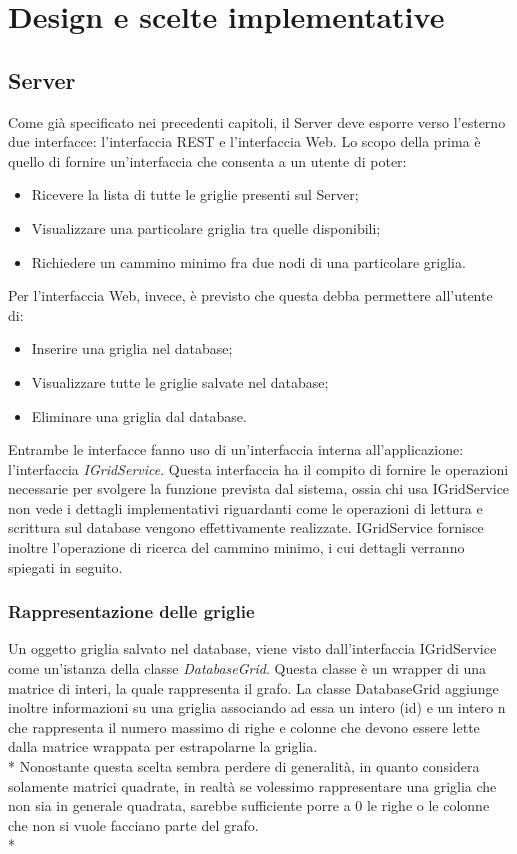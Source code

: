 \chapter{Design e scelte implementative}

\section{Server}

Come gi\`a specificato nei precedenti capitoli, il Server deve esporre verso l'esterno due interfacce: l'interfaccia REST e l'interfaccia Web. Lo scopo della prima \`e quello di fornire un'interfaccia che consenta a un utente di poter:
\begin{itemize}
	\item Ricevere la lista di tutte le griglie presenti sul Server;
	\item Visualizzare una particolare griglia tra quelle disponibili;
	\item Richiedere un cammino minimo fra due nodi di una particolare griglia.
\end{itemize}
Per l'interfaccia Web, invece, \`e previsto che questa debba permettere all'utente di:
\begin{itemize}
	\item Inserire una griglia nel database;
	\item Visualizzare tutte le griglie salvate nel database;
	\item Eliminare una griglia dal database.
\end{itemize}
Entrambe le interfacce fanno uso di un'interfaccia interna all'applicazione: l'interfaccia \emph{IGridService}. Questa interfaccia ha il compito di fornire le operazioni necessarie per svolgere la funzione prevista dal sistema, ossia chi usa IGridService non vede i dettagli implementativi riguardanti come le operazioni di lettura e scrittura sul database vengono effettivamente realizzate. IGridService fornisce inoltre l'operazione di ricerca del cammino minimo, i cui dettagli verranno spiegati in seguito.
\subsection{Rappresentazione delle griglie}
Un oggetto griglia salvato nel database, viene visto dall'interfaccia IGridService come un'istanza della classe \emph{DatabaseGrid}. Questa classe \`e un wrapper di una matrice di interi, la quale rappresenta il grafo. La classe DatabaseGrid aggiunge inoltre informazioni su una griglia associando ad essa un intero (id) e un intero n che rappresenta il numero massimo di righe e colonne che devono essere lette dalla matrice wrappata per estrapolarne la griglia.\\*
Nonostante questa scelta sembra perdere di generalit\`a, in quanto considera solamente matrici quadrate, in realt\`a se volessimo rappresentare una griglia che non sia in generale quadrata, sarebbe sufficiente porre a 0 le righe o le colonne che non si vuole facciano parte del grafo.\\*
